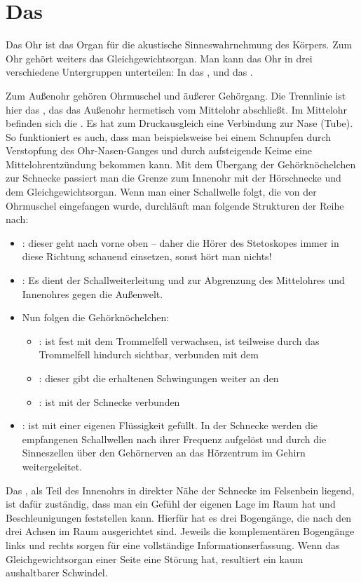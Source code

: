 \section{Das }
\label{topic:ohr} 

\TextSlide{\TxBeschreibung}
{%
Das Ohr ist das Organ für die akustische
Sinneswahrnehmung des Körpers. Zum Ohr gehört weiters das
Gleichgewichtsorgan.
Man kann das Ohr in drei verschiedene Untergruppen
unterteilen: In das ,  und das 
.

Zum Außenohr gehören Ohrmuschel und äußerer Gehörgang. Die
Trennlinie ist hier das , das das Außenohr
hermetisch vom Mittelohr abschließt. Im Mittelohr befinden
sich die . Es hat zum Druckausgleich
eine Verbindung zur Nase (Tube). So funktioniert es auch,
dass man beispielsweise bei einem Schnupfen durch Verstopfung des
Ohr-Nasen-Ganges und durch aufsteigende Keime eine
Mittelohrentzündung bekommen kann. Mit dem Übergang der
Gehörknöchelchen zur Schnecke passiert man die Grenze zum
Innenohr mit der Hörschnecke  und dem
Gleichgewichtsorgan. 
Wenn man einer Schallwelle folgt, die von der Ohrmuschel
eingefangen wurde, durchläuft man folgende Strukturen der
Reihe nach:
\begin{itemize}
  \item {}: dieser geht nach vorne oben
  -- daher die Hörer des Stetoskopes immer in diese Richtung
  schauend einsetzen, sonst hört man
  nichts!
  \item {}: Es dient der Schallweiterleitung
  und zur Abgrenzung des Mittelohres und Innenohres gegen die Außenwelt.
  \item Nun folgen die Gehörknöchelchen:
  \begin{itemize}
    \item {} : ist fest mit dem
    Trommelfell verwachsen, ist teilweise durch das
    Trommelfell hindurch sichtbar, verbunden mit dem
    \item {} : dieser gibt die erhaltenen
    Schwingungen weiter an den
    \item {} : ist mit der Schnecke
    verbunden
  \end{itemize}
  \item {} : ist mit einer eigenen
  Flüssigkeit gefüllt. In der Schnecke werden die
  empfangenen Schallwellen nach ihrer Frequenz aufgelöst und
  durch die Sinneszellen über den Gehörnerven an das
  Hörzentrum im Gehirn weitergeleitet.
\end{itemize}
Das , als Teil des Innenohrs in
direkter Nähe der Schnecke im Felsenbein liegend, ist dafür
zuständig, dass man ein Gefühl der eigenen Lage im Raum hat
und Beschleunigungen feststellen kann. Hierfür hat es drei
Bogengänge, die nach den drei Achsen im Raum ausgerichtet
sind. Jeweils die komplementären Bogengänge links und rechts
sorgen für eine vollständige Informationserfassung. Wenn das
Gleichgewichtsorgan einer Seite eine Störung hat, resultiert
ein kaum aushaltbarer Schwindel.
}

